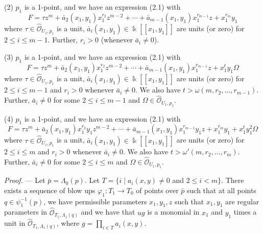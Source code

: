 \documentclass[11pt]{article}
\theoremstyle{plain}
\newcommand{\Oh}[1]{\widehat{\mathcal{O}}_{#1}}
\begin{document}
(2) $p_1$ is a 1-point, and we have an expression (2.1) with
\begin{equation}
F = \tau z^m + \bar{a}_2(x_1, y_1) x_1^{r_2} z^{m-2} + \cdots + \bar{a}_{m-1}(x_1, y_1) x_1^{r_{m-1}} z + x_1^{r_m} y_1
\tag{3.11}
\end{equation}
where $\tau \in \Oh{U_1,p_1}$ is a unit, $\bar{a}_i(x_1, y_1) \in \Bbbk[[x_1, y_1]]$ are units (or zero) for $2 \leqslant i \leqslant m-1$. Further, $r_i > 0$ (whenever $\bar{a}_i \neq 0$).

(3) $p_1$ is a 1-point, and we have an expression (2.1) with
\begin{equation}
F = \tau z^m + \bar{a}_2(x_1, y_1) x_1^{r_2} z^{m-2} + \cdots + \bar{a}_{m-1}(x_1, y_1) x_1^{r_{m-1}} z + x_1^t y_1 \Omega
\tag{3.12}
\end{equation}
where $\tau \in \Oh{U_1,p_1}$ is a unit, $\bar{a}_i(x_1, y_1) \in \Bbbk[[x_1, y_1]]$ are units (or zero) for $2 \leqslant i \leqslant m-1$ and $r_i > 0$ whenever $\bar{a}_i \neq 0$. We also have $t > \omega(m, r_2, \ldots, r_{m-1})$. Further, $\bar{a}_i \neq 0$ for some $2 \leqslant i \leqslant m-1$ and $\Omega \in \Oh{U_1,p_1}$.

(4) $p_1$ is a 1-point, and we have an expression (2.1) with
\begin{equation}
F = \tau z^m + \bar{a}_2(x_1, y_1) x_1^{r_2} y_1 z^{m-2} + \cdots + \bar{a}_{m-1}(x_1, y_1) x_1^{r_{m-1}} y_1 z + x_1^{r_m} y_1 + x_1^t y_1^2 \Omega
\tag{B}
\end{equation}
where $\tau \in \Oh{U_1,p_1}$ is a unit, $\bar{a}_i(x_1, y_1) \in \Bbbk[[x_1, y_1]]$ are units (or zero) for $2 \leqslant i \leqslant m$ and $r_i > 0$ whenever $\bar{a}_i \neq 0$. We also have $t > \omega'(m, r_2, \ldots, r_m)$. Further, $\bar{a}_i \neq 0$ for some $2 \leqslant i \leqslant m$ and $\Omega \in \Oh{U_1,p_1}$.


\noindent\emph{Proof.} --- Let $\bar{p} = \Lambda_0(p)$. Let $T = \{i \mid a_i(x, y) \neq 0$ and $2 \leqslant i < m\}$. There exists a sequence of blow ups $\varphi_1 : T_1 \to T_0$ of points over $\bar{p}$ such that at all points $q \in \psi_1^{-1}(p)$, we have permissible parameters $x_1, y_1, z$ such that $x_1, y_1$ are regular parameters in $\Oh{T_1,\Lambda_1(q)}$ and we have that $ug$ is a monomial in $x_1$ and $y_1$ times a unit in $\Oh{T_1,\Lambda_1(q)}$, where $g = \prod_{i \in T} a_i(x, y)$.
\end{document}
